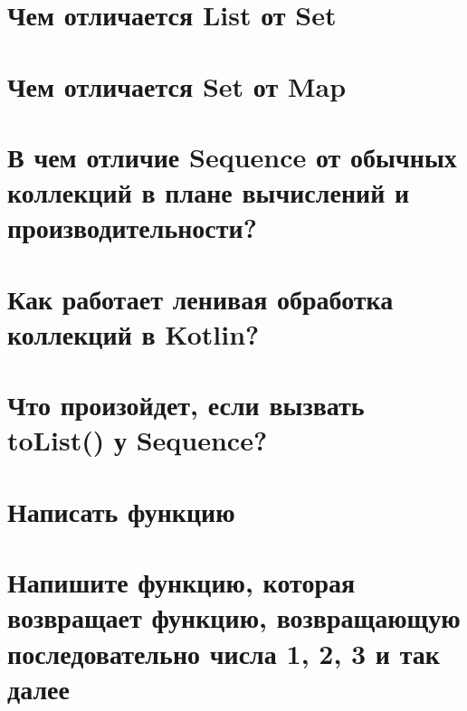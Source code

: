 \documentclass[12pt]{article}
\begin{document}
\section*{Чем отличается List от Set}
\begin{enumerate}[leftmargin=*]
\end{enumerate}
\vspace{2mm}
\section*{Чем отличается Set от Map}
\begin{enumerate}[leftmargin=*]
\end{enumerate}
\vspace{2mm}
\section*{В чем отличие Sequence от обычных коллекций в плане вычислений и производительности?}
\begin{enumerate}[leftmargin=*]
\end{enumerate}
\vspace{2mm}
\section*{Как работает ленивая обработка коллекций в Kotlin?}
\begin{enumerate}[leftmargin=*]
\end{enumerate}
\vspace{2mm}
\section*{Что произойдет, если вызвать toList() у Sequence?}
\begin{enumerate}[leftmargin=*]
\end{enumerate}
\vspace{2mm}
\section*{Написать функцию}
\begin{enumerate}[leftmargin=*]
\end{enumerate}
\vspace{2mm}
\section*{Напишите функцию, которая возвращает функцию, возвращающую последовательно числа 1, 2, 3 и так далее}
\begin{enumerate}[leftmargin=*]
\end{enumerate}
\vspace{2mm}
\end{document}
